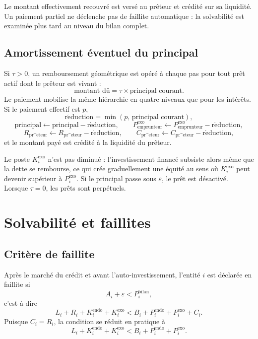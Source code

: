 \documentclass[11pt,a4paper]{article}
\begin{document}
Le montant effectivement recouvré est versé au prêteur et crédité sur sa liquidité. Un paiement partiel ne déclenche pas de faillite automatique : la solvabilité est examinée plus tard au niveau du bilan complet.

\subsection{Amortissement éventuel du principal}

Si \(\tau>0\), un remboursement géométrique est opéré à chaque pas pour tout prêt actif dont le prêteur est vivant :
\[
\text{montant dû} = \tau\times\text{principal courant}.
\]
Le paiement mobilise la même hiérarchie en quatre niveaux que pour les intérêts. Si le paiement effectif est \(p\),
\[
\mathrm{r\acute eduction}=\min(p,\,\text{principal courant}),
\]
\[
\text{principal}\leftarrow\text{principal}-\mathrm{r\acute eduction},\qquad
P_{\mathrm{emprunteur}}^{\mathrm{exo}}\leftarrow P_{\mathrm{emprunteur}}^{\mathrm{exo}}-\mathrm{r\acute eduction},
\]
\[
R_{\mathrm{pr\^eteur}}\leftarrow R_{\mathrm{pr\^eteur}}-\mathrm{r\acute eduction},\qquad
C_{\mathrm{pr\^eteur}}\leftarrow C_{\mathrm{pr\^eteur}}-\mathrm{r\acute eduction},
\]
et le montant payé est crédité à la liquidité du prêteur.

Le poste \(K_i^{\mathrm{exo}}\) n'est pas diminué : l'investissement financé subsiste alors même que la dette se rembourse, ce qui crée graduellement une équité au sens où \(K_i^{\mathrm{exo}}\) peut devenir supérieur à \(P_i^{\mathrm{exo}}\). Si le principal passe sous \(\varepsilon\), le prêt est désactivé. Lorsque \(\tau=0\), les prêts sont perpétuels.

\section{Solvabilité et faillites}

\subsection{Critère de faillite}

Après le marché du crédit et avant l'auto-investissement, l'entité \(i\) est déclarée en faillite si
\[
A_i + \varepsilon < P_i^{\mathrm{bilan}},
\]
c'est-à-dire
\[
L_i + R_i + K_i^{\mathrm{endo}} + K_i^{\mathrm{exo}} < B_i + P_i^{\mathrm{endo}} + P_i^{\mathrm{exo}} + C_i.
\]
Puisque \(C_i = R_i\), la condition se réduit en pratique à
\[
L_i + K_i^{\mathrm{endo}} + K_i^{\mathrm{exo}} < B_i + P_i^{\mathrm{endo}} + P_i^{\mathrm{exo}}.
\]
\end{document}
